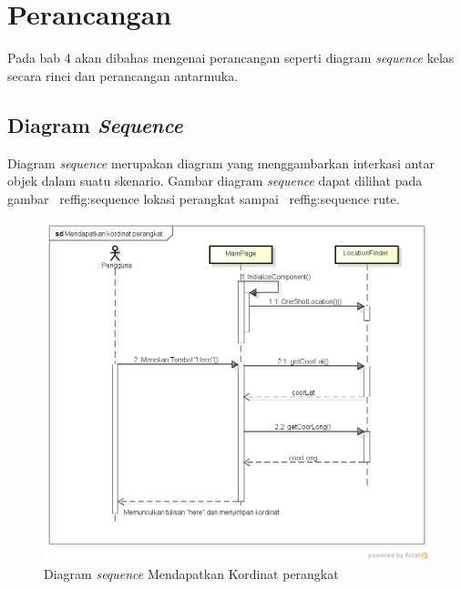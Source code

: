 \chapter{Perancangan}
\label{chap:Perancangan}

Pada bab 4 akan dibahas mengenai perancangan seperti diagram \textit{sequence} kelas secara rinci dan perancangan antarmuka.

\section{Diagram \textit{Sequence}}
\label{lab:Diagram Sequence}
\hspace{0.5cm} Diagram \textit{sequence} merupakan diagram yang menggambarkan interkasi antar objek dalam suatu skenario. Gambar diagram \textit{sequence} dapat dilihat pada gambar ~ref{fig:sequence lokasi perangkat} sampai ~ref{fig:sequence rute}. 

\begin{figure}[h]
	\centering
		\includegraphics[scale=0.4]{Gambar/sequence/MendapatkanKordinatPerangkat}
	\caption{Diagram \textit{sequence} Mendapatkan Kordinat perangkat}
	\label{fig:sequence lokasi perangkat}
\end{figure}

